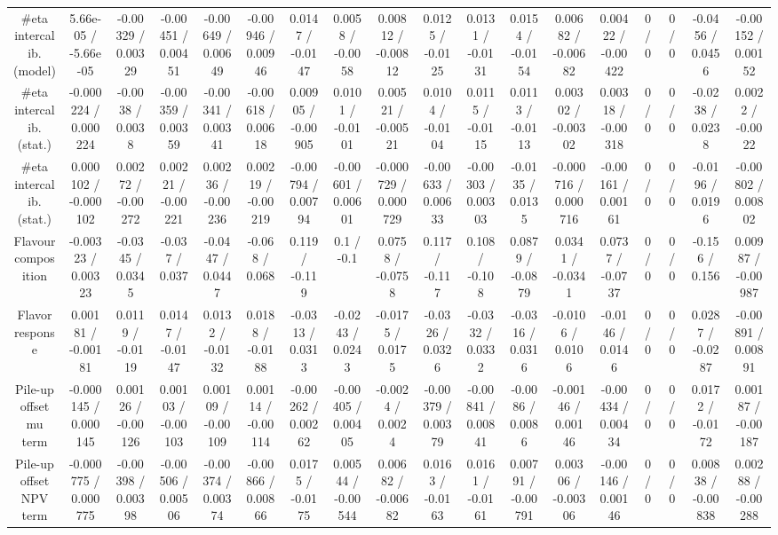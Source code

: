 \documentclass[10pt]{article}
\begin{document}
\begin{table}[htbp]
\begin{center}
\begin{tabular}{|c|c|c|c|c|c|c|c|c|c|c|c|c|c|c|c|c|c|}
  #eta intercalib. (model) & 5.66e-05 / -5.66e-05 & -0.00329 / 0.00329 & -0.00451 / 0.00451 & -0.00649 / 0.00649 & -0.00946 / 0.00946 & 0.0147 / -0.0147 & 0.0058 / -0.0058 & 0.00812 / -0.00812 & 0.0125 / -0.0125 & 0.0131 / -0.0131 & 0.0154 / -0.0154 & 0.00682 / -0.00682 & 0.00422 / -0.00422 & 0 / 0 & 0 / 0 & -0.0456 / 0.0456 & -0.00152 / 0.00152 \\ 
  #eta intercalib. (stat.) & -0.000224 / 0.000224 & -0.0038 / 0.0038 & -0.00359 / 0.00359 & -0.00341 / 0.00341 & -0.00618 / 0.00618 & 0.00905 / -0.00905 & 0.0101 / -0.0101 & 0.00521 / -0.00521 & 0.0104 / -0.0104 & 0.0115 / -0.0115 & 0.0113 / -0.0113 & 0.00302 / -0.00302 & 0.00318 / -0.00318 & 0 / 0 & 0 / 0 & -0.0238 / 0.0238 & 0.0022 / -0.0022 \\ 
  #eta intercalib. (stat.) & 0.000102 / -0.000102 & 0.00272 / -0.00272 & 0.00221 / -0.00221 & 0.00236 / -0.00236 & 0.00219 / -0.00219 & -0.00794 / 0.00794 & -0.00601 / 0.00601 & -0.000729 / 0.000729 & -0.00633 / 0.00633 & -0.00303 / 0.00303 & -0.0135 / 0.0135 & -0.000716 / 0.000716 & -0.00161 / 0.00161 & 0 / 0 & 0 / 0 & -0.0196 / 0.0196 & -0.00802 / 0.00802 \\ 
  Flavour composition & -0.00323 / 0.00323 & -0.0345 / 0.0345 & -0.037 / 0.037 & -0.0447 / 0.0447 & -0.068 / 0.068 & 0.119 / -0.119 & 0.1 / -0.1 & 0.0758 / -0.0758 & 0.117 / -0.117 & 0.108 / -0.108 & 0.0879 / -0.0879 & 0.0341 / -0.0341 & 0.0737 / -0.0737 & 0 / 0 & 0 / 0 & -0.156 / 0.156 & 0.00987 / -0.00987 \\ 
  Flavor response & 0.00181 / -0.00181 & 0.0119 / -0.0119 & 0.0147 / -0.0147 & 0.0132 / -0.0132 & 0.0188 / -0.0188 & -0.0313 / 0.0313 & -0.0243 / 0.0243 & -0.0175 / 0.0175 & -0.0326 / 0.0326 & -0.0332 / 0.0332 & -0.0316 / 0.0316 & -0.0106 / 0.0106 & -0.0146 / 0.0146 & 0 / 0 & 0 / 0 & 0.0287 / -0.0287 & -0.00891 / 0.00891 \\ 
  Pile-up offset mu term & -0.000145 / 0.000145 & 0.00126 / -0.00126 & 0.00103 / -0.00103 & 0.00109 / -0.00109 & 0.00114 / -0.00114 & -0.00262 / 0.00262 & -0.00405 / 0.00405 & -0.0024 / 0.0024 & -0.00379 / 0.00379 & -0.00841 / 0.00841 & -0.0086 / 0.0086 & -0.00146 / 0.00146 & -0.00434 / 0.00434 & 0 / 0 & 0 / 0 & 0.0172 / -0.0172 & 0.00187 / -0.00187 \\ 
  Pile-up offset NPV term & -0.000775 / 0.000775 & -0.00398 / 0.00398 & -0.00506 / 0.00506 & -0.00374 / 0.00374 & -0.00866 / 0.00866 & 0.0175 / -0.0175 & 0.00544 / -0.00544 & 0.00682 / -0.00682 & 0.0163 / -0.0163 & 0.0161 / -0.0161 & 0.00791 / -0.00791 & 0.00306 / -0.00306 & -0.00146 / 0.00146 & 0 / 0 & 0 / 0 & 0.00838 / -0.00838 & 0.00288 / -0.00288 \\ 

\end{tabular}
\end{center}
\end{table}
\end{document}

